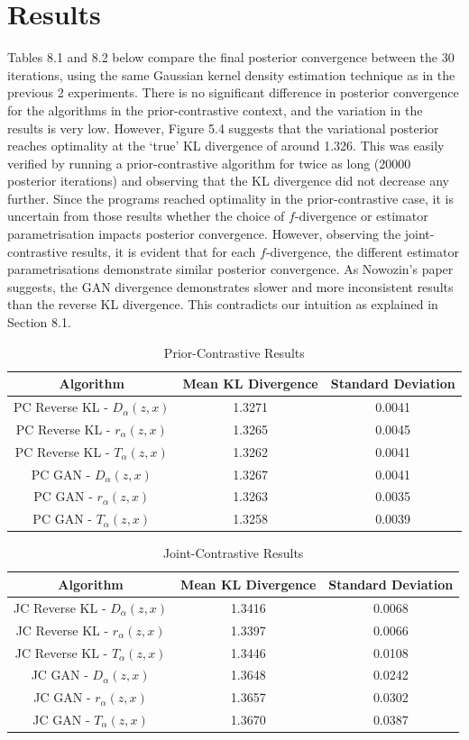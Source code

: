\documentclass[honours,12pt]{unswthesis}
\numberwithin{equation}{section}
\theoremstyle{definition}
\begin{document}
\section{Results}
Tables 8.1 and 8.2 below compare the final posterior convergence between the 30 iterations, using the same Gaussian kernel density estimation technique as in the previous 2 experiments. There is no significant difference in posterior convergence for the algorithms in the prior-contrastive context, and the variation in the results is very low. However, Figure 5.4 suggests that the variational posterior reaches optimality at the `true' KL divergence of around 1.326. This was easily verified by running a prior-contrastive algorithm for twice as long (20000 posterior iterations) and observing that the KL divergence did not decrease any further. Since the programs reached optimality in the prior-contrastive case, it is uncertain from those results whether the choice of $f$-divergence or estimator parametrisation impacts posterior convergence. However, observing the joint-contrastive results, it is evident that for each $f$-divergence, the different estimator parametrisations demonstrate similar posterior convergence. As Nowozin's paper suggests, the GAN divergence demonstrates slower and more inconsistent results than the reverse KL divergence. This contradicts our intuition as explained in Section 8.1.
\begin{table}[h!]
\centering
\begin{tabular}{|c|c|c|}
\hline
Algorithm & Mean KL Divergence & Standard Deviation\\
\hline
PC Reverse KL - $D_\alpha(z,x)$ & 1.3271 & 0.0041\\
\hline
PC Reverse KL - $r_\alpha(z,x)$ & 1.3265 & 0.0045\\
\hline
PC Reverse KL - $T_\alpha(z,x)$ & 1.3262 & 0.0041\\
\hline
PC GAN - $D_\alpha(z,x)$ & 1.3267 & 0.0041\\
\hline
PC GAN - $r_\alpha(z,x)$ & 1.3263 & 0.0035\\
\hline
PC GAN - $T_\alpha(z,x)$ & 1.3258 & 0.0039\\
\hline
\end{tabular}
\caption{Prior-Contrastive Results}
\end{table}
\begin{table}[h!]
\centering
\begin{tabular}{|c|c|c|}
\hline
Algorithm & Mean KL Divergence & Standard Deviation\\
\hline
JC Reverse KL - $D_\alpha(z,x)$ & 1.3416 & 0.0068\\
\hline
JC Reverse KL - $r_\alpha(z,x)$ & 1.3397 & 0.0066\\
\hline
JC Reverse KL - $T_\alpha(z,x)$ & 1.3446 & 0.0108\\
\hline
JC GAN - $D_\alpha(z,x)$ & 1.3648 & 0.0242\\
\hline
JC GAN - $r_\alpha(z,x)$ & 1.3657 & 0.0302\\
\hline
JC GAN - $T_\alpha(z,x)$ & 1.3670 & 0.0387\\
\hline
\end{tabular}
\caption{Joint-Contrastive Results}
\end{table}
\end{document}
